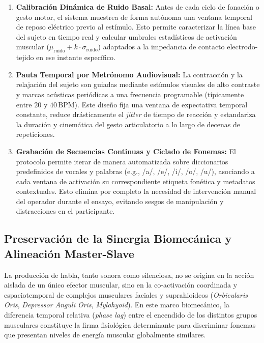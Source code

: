 \begin{enumerate}
    \item \textbf{Calibración Dinámica de Ruido Basal:} Antes de cada ciclo de fonación o gesto motor, el sistema muestrea de forma autónoma una ventana temporal de reposo eléctrico previo al estímulo. Esto permite caracterizar la línea base del sujeto en tiempo real y calcular umbrales estadísticos de activación muscular ($\mu_{\text{ruido}} + k \cdot \sigma_{\text{ruido}}$) adaptados a la impedancia de contacto electrodo-tejido en ese instante específico.
    \item \textbf{Pauta Temporal por Metrónomo Audiovisual:} La contracción y la relajación del sujeto son guiadas mediante estímulos visuales de alto contraste y marcas acústicas periódicas a una frecuencia programable (típicamente entre $20$ y $40\,\text{BPM}$). Este diseño fija una ventana de expectativa temporal constante, reduce drásticamente el \textit{jitter} de tiempo de reacción y estandariza la duración y cinemática del gesto articulatorio a lo largo de decenas de repeticiones.
    \item \textbf{Grabación de Secuencias Continuas y Ciclado de Fonemas:} El protocolo permite iterar de manera automatizada sobre diccionarios predefinidos de vocales y palabras (e.g., /a/, /e/, /i/, /o/, /u/), asociando a cada ventana de activación su correspondiente etiqueta fonética y metadatos contextuales. Esto elimina por completo la necesidad de intervención manual del operador durante el ensayo, evitando sesgos de manipulación y distracciones en el participante.
\end{enumerate}

\subsection{Preservación de la Sinergia Biomecánica y Alineación Master-Slave}
\label{subsec:sinergia_master_slave}

La producción de habla, tanto sonora como silenciosa, no se origina en la acción aislada de un único efector muscular, sino en la co-activación coordinada y espaciotemporal de complejos musculares faciales y suprahioideos (\textit{Orbicularis Oris}, \textit{Depressor Anguli Oris}, \textit{Mylohyoid}). En este marco biomecánico, la diferencia temporal relativa (\textit{phase lag}) entre el encendido de los distintos grupos musculares constituye la firma fisiológica determinante para discriminar fonemas que presentan niveles de energía muscular globalmente similares.


